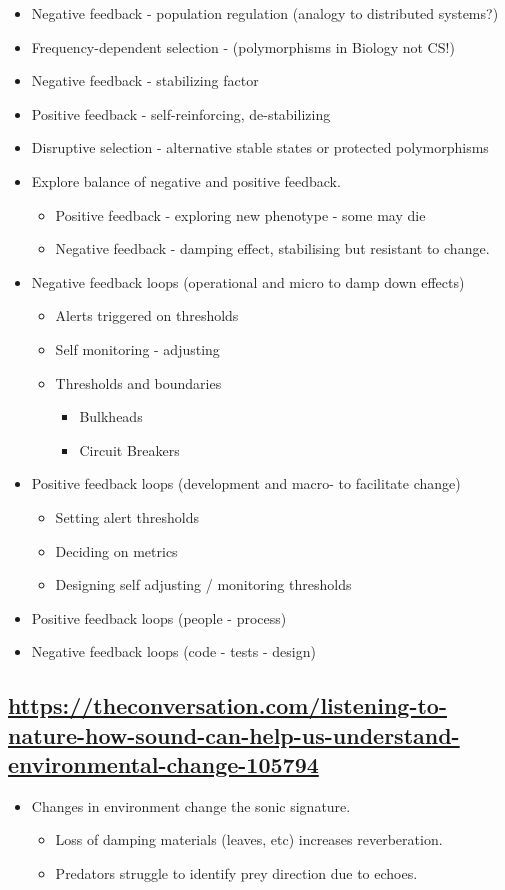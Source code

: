 \documentclass[11pt]{article}
\begin{document}
\begin{itemize}
\item Negative feedback - population regulation (analogy to
distributed systems?)
\item Frequency-dependent selection - (polymorphisms in Biology not CS!)
\item Negative feedback - stabilizing factor
\item Positive feedback - self-reinforcing, de-stabilizing
\item Disruptive selection - alternative stable states or protected polymorphisms
\item Explore balance of negative and positive feedback.
\begin{itemize}
\item Positive feedback - exploring new phenotype - some may die
\item Negative feedback - damping effect, stabilising but resistant
to change.
\end{itemize}
\item Negative feedback loops (operational and micro to damp down effects)
\begin{itemize}
\item Alerts triggered on thresholds
\item Self monitoring - adjusting
\item Thresholds and boundaries
\begin{itemize}
\item Bulkheads
\item Circuit Breakers
\end{itemize}
\end{itemize}
\item Positive feedback loops (development and macro- to facilitate change)
\begin{itemize}
\item Setting alert thresholds
\item Deciding on metrics
\item Designing self adjusting / monitoring thresholds
\end{itemize}
\item Positive feedback loops (people - process)
\item Negative feedback loops (code - tests - design)
\end{itemize}
\subsection{\url{https://theconversation.com/listening-to-nature-how-sound-can-help-us-understand-environmental-change-105794}}
\label{sec:org59ccd2a}
\begin{itemize}
\item Changes in environment change the sonic signature.
\begin{itemize}
\item Loss of damping materials (leaves, etc) increases
reverberation.
\item Predators struggle to identify prey direction due to echoes.
\end{itemize}
\end{itemize}
\end{document}
